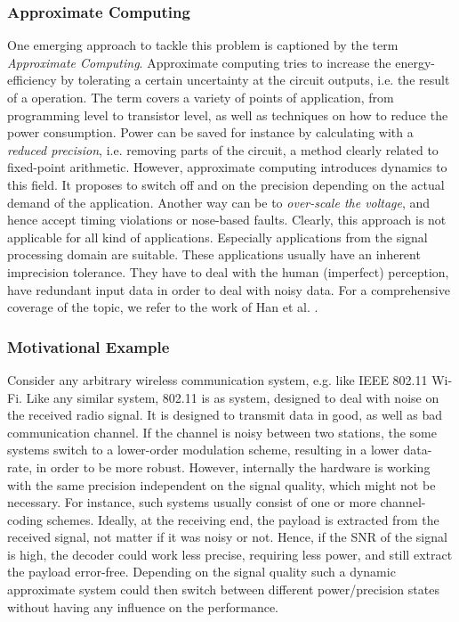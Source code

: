 \documentclass[conference]{IEEEtran}
\begin{document}
\subsubsection*{Approximate Computing}
One emerging approach to tackle this problem is captioned by the term \emph{Approximate Computing}. Approximate computing tries to increase the energy-efficiency by tolerating a certain uncertainty at the circuit outputs, i.e. the result of a operation. The term covers a variety of points of application, from programming level to transistor level, as well as techniques on how to reduce the power consumption. Power can be saved for instance by calculating with a \emph{reduced precision}, i.e. removing parts of the circuit, a method clearly related to fixed-point arithmetic. However, approximate computing introduces dynamics to this field. It proposes to switch off and on the precision depending on the actual demand of the application. Another way can be to \emph{over-scale the voltage}, and hence accept timing violations or nose-based faults. 
Clearly, this approach is not applicable for all kind of applications. Especially applications from the signal processing domain are suitable. These applications usually have an inherent imprecision tolerance. They have to deal with the human (imperfect) perception, have redundant input data in order to deal with noisy data. For a comprehensive coverage of the topic, we refer to the work of Han et al. \cite{han_approximate_2013}.
\subsubsection*{Motivational Example}
Consider any arbitrary wireless communication system, e.g. like IEEE 802.11 Wi-Fi. Like any similar system, 802.11 is as system, designed to deal with noise on the received radio signal. It is designed to transmit data in good, as well as bad communication channel. If the channel is noisy between two stations, the some systems switch to a lower-order modulation scheme, resulting in a lower data-rate, in order to be more robust. However, internally the hardware is working with the same precision independent on the signal quality, which might not be necessary. For instance, such systems usually consist of one or more channel-coding schemes. Ideally, at the receiving end, the payload is extracted from the received signal, not matter if it was noisy or not. Hence, if the SNR of the signal is high, the decoder could work less precise, requiring less power, and still extract the payload error-free. Depending on the signal quality such a dynamic approximate system could then switch between different power/precision states without having any influence on the performance.
\end{document}
